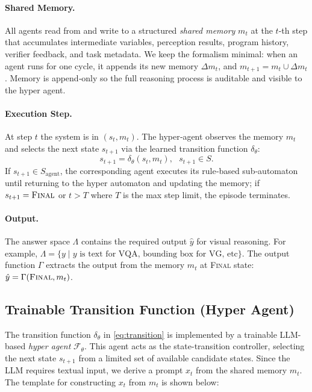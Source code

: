 \documentclass{article} %
\begin{document}
\paragraph{Shared Memory.} All agents read from and write to a structured \emph{shared memory} $m_t$ at the $t$-th step that accumulates intermediate variables, perception results, program history, verifier feedback, and task metadata. We keep the formalism minimal: when an agent runs for one cycle, it appends its new memory $\Delta m_t$, and $m_{t+1}=m_t\cup\Delta m_t$. Memory is append‑only so the full reasoning process is auditable and visible to the hyper agent.

\paragraph{Execution Step.} At step $t$ the system is in $(s_t,m_t)$. The hyper‑agent observes the memory $m_t$ and selects the next state $s_{t+1}$ via the learned transition function $\delta_\theta$:
\begin{equation}
s_{t+1}=\delta_{\theta}(s_t,m_t),\ \ \ s_{t+1}\in S.
\label{eq:transition}
\end{equation}
If $s_{t+1}\in S_{\mathrm{agent}}$, the corresponding agent executes its rule‑based sub‑automaton until returning to the hyper automaton and updating the memory;
if $s_{t+1} = \textsc{Final}$ or $t > T$ where $T$ is the max step limit, the episode terminates.

\paragraph{Output.} 
The answer space $\Lambda$ contains the required output $\hat{y}$ for visual reasoning. For example, $\Lambda = \{y \mid y \text{ is text for VQA, bounding box for VG, etc}\}$. The output function $\Gamma$ extracts the output from the memory $m_t$ at \textsc{Final} state: $\hat{y}=\Gamma(\textsc{Final},m_t)$.

\subsection{Trainable Transition Function (Hyper Agent)}
\label{subsec:transition}

The transition function $\delta_\theta$ in \autoref{eq:transition} is implemented by a trainable LLM-based \emph{hyper agent} $\mathcal{F}_\theta$. This agent acts as the state-transition controller, selecting the next state $s_{t+1}$ from a limited set of available candidate states. Since the LLM requires textual input, we derive a prompt $x_t$ from the shared memory $m_t$. The template for constructing $x_t$ from $m_t$ is shown below:
\end{document}

